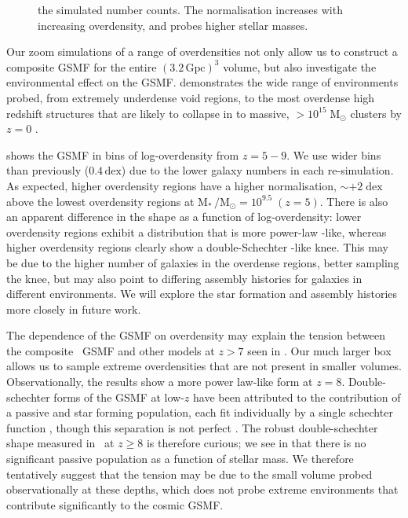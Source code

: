 \begin{figure}
{the simulated number counts.
    The normalisation increases with increasing overdensity, and probes higher stellar masses.}
    \label{fig:gsmf_overdensity}
\end{figure}

Our zoom simulations of a range of overdensities not only allow us to construct a composite GSMF for the entire $(3.2 \, \mathrm{Gpc})^{3}$ volume, but also investigate the environmental effect on the GSMF.
 demonstrates the wide range of environments probed, from extremely underdense void regions, to the most overdense high redshift structures that are likely to collapse in to massive, $> 10^{15} \; \mathrm{M_{\odot}}$ clusters by $z = 0$ \citep{chiang_ancient_2013,lovell_characterising_2018}.

 shows the GSMF in bins of log-overdensity from $z = 5 - 9$.
We use wider bins than previously ($0.4 \, \mathrm{dex}$) due to the lower galaxy numbers in each re-simulation.
As expected, higher overdensity regions have a higher normalisation, $\sim +2 \; \mathrm{dex}$ above the lowest overdensity regions at $\mathrm{M_{*}} \,/ \mathrm{M_{\odot}} = 10^{9.5} \; (z = 5)$.
There is also an apparent difference in the shape as a function of log-overdensity:
lower overdensity regions exhibit a distribution that is more power-law -like, whereas higher overdensity regions clearly show a double-Schechter -like knee.
This may be due to the higher number of galaxies in the overdense regions, better sampling the knee, but may also point to differing assembly histories for galaxies in different environments.
We will explore the star formation and assembly histories more closely in future work.


The dependence of the GSMF on overdensity may explain the tension between the composite \flares\ GSMF and other models at $z > 7$ seen in .
Our much larger box allows us to sample extreme overdensities that are not present in smaller volumes.
Observationally, the \cite{song_evolution_2016} results show a more power law-like form at $z = 8$.
Double-schechter forms of the GSMF at low-$z$ have been attributed to the contribution of a passive and star forming population, each fit individually by a single schechter function \citep{kelvin_galaxy_2014,moffett_galaxy_2016}, though this separation is not perfect \citep[\textit{e.g.}][]{ilbert_mass_2013,tomczak_sfr-m*_2016}.
The robust double-schechter shape measured in \flares\ at $z \geqslant 8$ is therefore curious; we see in  that there is no significant passive population as a function of stellar mass.
We therefore tentatively suggest that the tension may be due to the small volume probed observationally at these depths, which does not probe extreme environments that contribute significantly to the cosmic GSMF.


